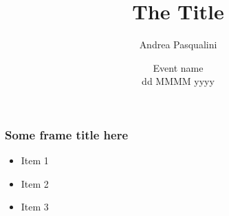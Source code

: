 \documentclass{beamer}
\author[A.~Pasqualini]{
	Andrea Pasqualini
}
\institute[Place]{
	Some place university
}
\title[Shorter Title]{
	The Title
}
\date[dd MMM yyyy]{
	Event name \\
	dd MMMM yyyy
}
\begin{document}
	\begin{frame}
		\frametitle{Some frame title here}
		\begin{itemize}
			\item Item 1
			\item Item 2
			\item Item 3
		\end{itemize}
	\end{frame}
\end{document}
